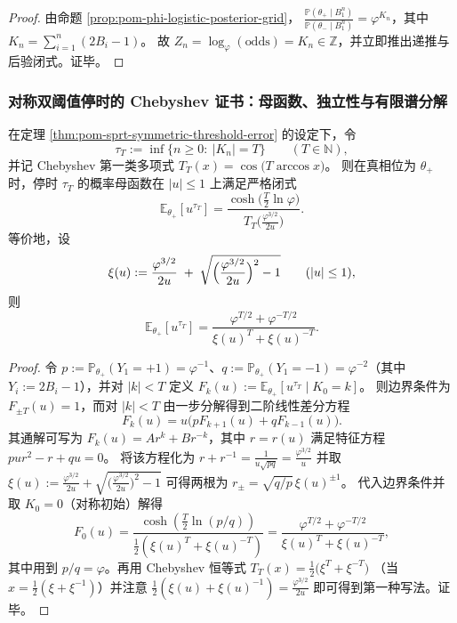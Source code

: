 \begin{proof}
由命题 \ref{prop:pom-phi-logistic-posterior-grid}，
\(
\frac{\mathbb{P}(\theta_+\mid B_1^n)}{\mathbb{P}(\theta_-\mid B_1^n)}=\varphi^{K_n}
\)，其中
\(
K_n=\sum_{i=1}^n(2B_i-1)
\)。
故 \(Z_n=\log_\varphi(\text{odds})=K_n\in\mathbb{Z}\)，并立即推出递推与后验闭式。证毕。
\end{proof}

\subsubsection{对称双阈值停时的 Chebyshev 证书：母函数、独立性与有限谱分解}\label{subsubsec:pom-chebyshev-stopping-time-spectral}

\begin{theorem}\label{thm:pom-symmetric-double-threshold-pgf-chebyshev}
在定理 \ref{thm:pom-sprt-symmetric-threshold-error} 的设定下，令
\[
\tau_T:=\inf\{n\ge 0:\ |K_n|=T\}\qquad(T\in\mathbb{N}),
\]
并记 Chebyshev 第一类多项式 \(T_T(x)=\cos\!\bigl(T\arccos x\bigr)\)。
则在真相位为 \(\theta_+\) 时，停时 \(\tau_T\) 的概率母函数在 \(|u|\le 1\) 上满足严格闭式
\[
\boxed{\;
\mathbb{E}_{\theta_+}[u^{\tau_T}]
=\frac{\cosh\!\bigl(\tfrac{T}{2}\ln\varphi\bigr)}{T_T\!\bigl(\tfrac{\varphi^{3/2}}{2u}\bigr)}.\;}
\]
等价地，设
\[
\xi(u):=\frac{\varphi^{3/2}}{2u}
\;+\;\sqrt{\Bigl(\frac{\varphi^{3/2}}{2u}\Bigr)^2-1}\qquad(|u|\le 1),
\]
则
\[
\boxed{\;
\mathbb{E}_{\theta_+}[u^{\tau_T}]
=\frac{\varphi^{T/2}+\varphi^{-T/2}}{\xi(u)^T+\xi(u)^{-T}}.\;}
\]
\end{theorem}

\begin{proof}
令 \(p:=\mathbb{P}_{\theta_+}(Y_1=+1)=\varphi^{-1}\)、\(q:=\mathbb{P}_{\theta_+}(Y_1=-1)=\varphi^{-2}\)（其中 \(Y_i:=2B_i-1\)），并对 \(|k|<T\) 定义
\(
F_k(u):=\mathbb{E}_{\theta_+}[u^{\tau_T}\mid K_0=k]
\)。
则边界条件为 \(F_{\pm T}(u)=1\)，而对 \(|k|<T\) 由一步分解得到二阶线性差分方程
\[
F_k(u)=u\bigl(pF_{k+1}(u)+qF_{k-1}(u)\bigr).
\]
其通解可写为 \(F_k(u)=A r^k+B r^{-k}\)，其中 \(r=r(u)\) 满足特征方程
\(
pu r^2-r+qu=0
\)。
将该方程化为
\(
r+r^{-1}=\frac{1}{u\sqrt{pq}}=\frac{\varphi^{3/2}}{u}
\)
并取
\(
\xi(u):=\frac{\varphi^{3/2}}{2u}+\sqrt{\bigl(\frac{\varphi^{3/2}}{2u}\bigr)^2-1}
\)
可得两根为
\(
r_\pm=\sqrt{q/p}\,\xi(u)^{\pm 1}
\)。
代入边界条件并取 \(K_0=0\)（对称初始）解得
\[
F_0(u)=\frac{\cosh(\tfrac{T}{2}\ln(p/q))}{\frac12(\xi(u)^T+\xi(u)^{-T})}
=\frac{\varphi^{T/2}+\varphi^{-T/2}}{\xi(u)^T+\xi(u)^{-T}},
\]
其中用到 \(p/q=\varphi\)。再用 Chebyshev 恒等式
\(
T_T(x)=\frac12\bigl(\xi^T+\xi^{-T}\bigr)
\)
（当 \(x=\frac12(\xi+\xi^{-1})\)）并注意
\(
\frac12(\xi(u)+\xi(u)^{-1})=\frac{\varphi^{3/2}}{2u}
\)
即可得到第一种写法。证毕。
\end{proof}

